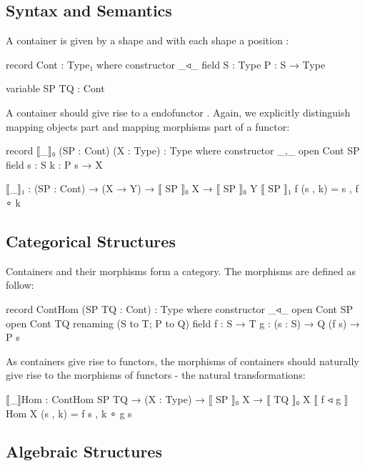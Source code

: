 \subsection{Syntax and Semantics}

A container is given by a shape  and with each shape a position :

\begin{code}
record Cont : Type₁ where
  constructor _◃_
  field
    S : Type
    P : S → Type
\end{code}

\begin{code}[hide]
variable SP TQ : Cont
\end{code}

A container should give rise to a endofunctor   . Again, we explicitly distinguish mapping objects part and mapping morphisms part of a functor:

\begin{code}
record ⟦_⟧₀ (SP : Cont) (X : Type) : Type where
  constructor _,_
  open Cont SP
  field
    s : S
    k : P s → X

⟦_⟧₁ : (SP : Cont) → (X → Y) → ⟦ SP ⟧₀ X → ⟦ SP ⟧₀ Y
⟦ SP ⟧₁ f (s , k) = s , f ∘ k
\end{code}

\subsection{Categorical Structures}

Containers and their morphisms form a category. The morphisms are defined as follow:

\begin{code}
record ContHom (SP TQ : Cont) : Type where
  constructor _◃_
  open Cont SP
  open Cont TQ renaming (S to T; P to Q)
  field
    f : S → T
    g : (s : S) → Q (f s) → P s
\end{code}

As containers give rise to functors, the morphisms of containers should naturally give rise to the morphisms of functors - the natural transformations:

\begin{code}
⟦_⟧Hom : ContHom SP TQ → (X : Type) → ⟦ SP ⟧₀ X → ⟦ TQ ⟧₀ X
⟦ f ◃ g ⟧Hom X (s , k) = f s , k ∘ g s
\end{code}

\subsection{Algebraic Structures}

